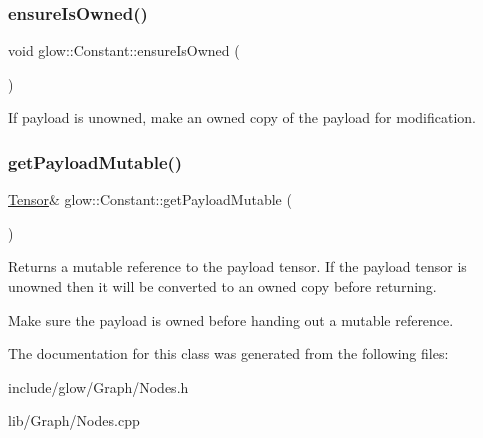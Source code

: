 \subsubsection{\texorpdfstring{ensure\+Is\+Owned()}{ensureIsOwned()}}
{\footnotesize\ttfamily void glow\+::\+Constant\+::ensure\+Is\+Owned (\begin{DoxyParamCaption}{ }\end{DoxyParamCaption})\hspace{0.3cm}{\ttfamily [inline]}}

If payload is unowned, make an owned copy of the payload for modification. \mbox{\label{classglow_1_1_constant_ace7a74284d69823f398ad069fce905c1}} 
\subsubsection{\texorpdfstring{get\+Payload\+Mutable()}{getPayloadMutable()}}
{\footnotesize\ttfamily \hyperlink{classglow_1_1_tensor}{Tensor}\& glow\+::\+Constant\+::get\+Payload\+Mutable (\begin{DoxyParamCaption}{ }\end{DoxyParamCaption})\hspace{0.3cm}{\ttfamily [inline]}}

\begin{DoxyReturn}{Returns}
a mutable reference to the payload tensor. If the payload tensor is unowned then it will be converted to an owned copy before returning. 
\end{DoxyReturn}
Make sure the payload is owned before handing out a mutable reference. 

The documentation for this class was generated from the following files\+:\begin{DoxyCompactItemize}
\item 
include/glow/\+Graph/Nodes.\+h\item 
lib/\+Graph/Nodes.\+cpp\end{DoxyCompactItemize}
